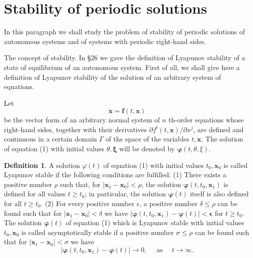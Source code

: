 \documentclass[10pt,a5paper]{book}
\theoremstyle{plain}
\theoremstyle{definition}
\newtheorem*{definition}{Definition}
\theoremstyle{remark}
\begin{document}
\section{Stability of periodic solutions}
In this paragraph we shall study the problem of stability of periodic solutions of autonomous systems and of systems with periodic right-hand sides.

The concept of stability. In §26 we gave the definition of Lyapunov stability of a state of equilibrium of an autonomous system. First of all, we shall give here a definition of Lyapunov stability of the solution of an arbitrary system of equations.

Let
\begin{equation*}
\dot{\mathbf{x}}=\mathbf{f}(t, \mathbf{x}) \tag{1}
\end{equation*}
be the vector form of an arbitrary normal system of $n$ th-order equations whose right-hand sides, together with their derivatives $\partial f^{i}(t, \mathbf{x}) / \partial x^{j}$, are defined and continuous in a certain domain $\Gamma$ of the space of the variables $t, \mathbf{x}$. The solution of equation (1) with initial values $\theta, \mathbf{\xi}$ will be denoted by $\boldsymbol{\varphi}(t, \theta, \xi)$.

\begin{definition}
A solution $\varphi(t)$ of equation (1) with initial values $t_{0}, \mathbf{x}_{0}$ is called Lyapunov stable if the following conditions are fulfilled: (1) There exists a positive number $\rho$ such that, for $\left|\mathbf{x}_{1}-\mathbf{x}_{0}\right|<\rho$, the solution $\boldsymbol{\varphi}\left(t, t_{0}, \mathbf{x}_{1}\right)$ is defined for all values $t \geq t_{0}$; in particular, the solution $\boldsymbol{\varphi}(t)$ itself is also defined for all $t \geq t_{0}$. (2) For every positive number $\epsilon$, a positive
number $\delta \leq \rho$ can be found such that for $\left|\mathbf{x}_{1}-\mathbf{x}_{0}\right|<\delta$ we have $\left|\boldsymbol{\varphi}\left(t, t_{0}, \mathbf{x}_{1}\right)-\boldsymbol{\varphi}(t)\right|<\boldsymbol{\epsilon}$ for $t \geq t_{0}$. The solution $\boldsymbol{\varphi}(t)$ of equation (1) which is Lyapunov stable with initial values $t_{0}, \mathbf{x}_{0}$ is called asymptotically stable if a positive number $\sigma \leq \rho$ can be found such that for $\left|\mathbf{x}_{1}-\mathbf{x}_{0}\right|<\sigma$ we have
\[
\left|\boldsymbol{\varphi}\left(t, t_{0}, \mathbf{x}_{1}\right)-\boldsymbol{\varphi}(t)\right| \rightarrow 0, \quad \text { as } \quad t \rightarrow \infty .
\]
\end{definition}
\end{document}
